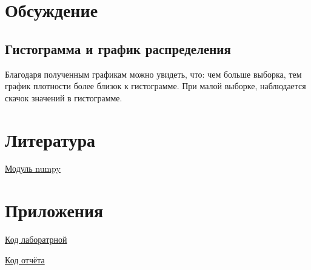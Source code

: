 \documentclass[a4]{article}
\begin{document}
	\section{Обсуждение}
		\subsection{Гистограмма и график распределения}
		Благодаря полученным графикам можно увидеть, что: чем больше выборка, тем график плотности более близок к гистограмме. При малой выборке, наблюдается скачок значений в гистограмме.
	
	\section{Литература}
	
	\href{https://physics.susu.ru/vorontsov/language/numpy.html}{Модуль numpy}
	
	\section{Приложения}
	
	\href{https://github.com/LuciusGen/Matstat/blob/master/Lab1/Lab1.py}{Код лаборатрной}
	
	\href{https://github.com/LuciusGen/Matstat/blob/master/Lab1/document.tex}{Код отчёта}
	
\end{document}
